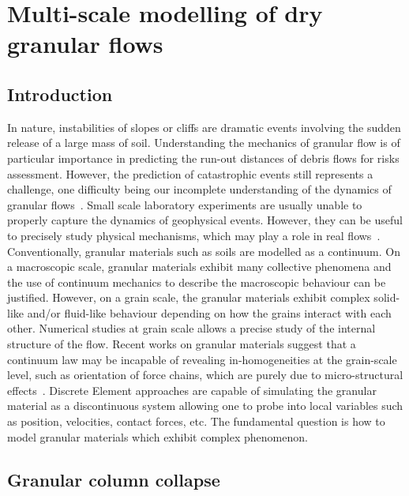 \chapter{Multi-scale modelling of dry granular flows}

\ifpdf
    \graphicspath{{Chapter4/figs/raster/}{Chapter4/figs/pdf/}{Chapter4/figs/}}
\else
    \graphicspath{{Chapter4/figs/vector/}{Chapter4/figs/}}
\fi

\section{Introduction}

In nature, instabilities of slopes or cliffs are dramatic events involving the 
sudden release of a large mass of soil. Understanding the mechanics of granular 
flow is of particular importance in predicting the run-out distances of debris 
flows for risks assessment. However, the prediction of catastrophic events 
still represents a challenge, one difficulty being our incomplete understanding 
of the dynamics of granular flows~\citep{Rondon2011}. Small scale laboratory 
experiments are usually unable to properly capture the dynamics of geophysical
events. However, they can be useful to precisely study physical mechanisms, 
which may play a role in real flows~\citep{Iverson1997}. Conventionally, 
granular materials such as soils are modelled as a continuum. On a macroscopic 
scale, granular materials exhibit many collective phenomena and the use of 
continuum mechanics to describe the macroscopic behaviour can be justified. 
However, on a grain scale, the granular materials exhibit complex solid-like 
and/or fluid-like behaviour depending on how the grains interact with each 
other. Numerical studies at grain scale allows a precise study of the internal 
structure of the flow. Recent works on granular materials suggest that a 
continuum law may be incapable of revealing in-homogeneities at the 
grain-scale level, such as orientation of force chains, which are purely due to 
micro-structural effects~\cite{Rycroft2009a}. Discrete Element approaches are 
capable of simulating the granular material as a discontinuous system allowing 
one to probe into local variables such as position, velocities, contact forces, 
etc. The fundamental question is how to model granular materials which 
exhibit complex phenomenon.


\section{Granular column collapse}


